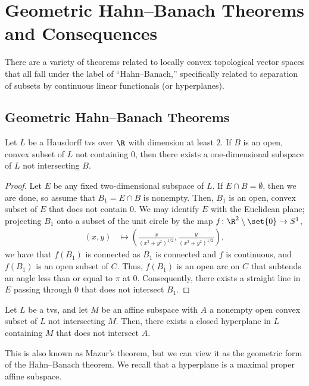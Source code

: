 \documentclass[10pt]{mypackage}
\begin{document}
\section{Geometric Hahn--Banach Theorems and Consequences}%
There are a variety of theorems related to locally convex topological vector spaces that all fall under the label of ``Hahn--Banach,'' specifically related to separation of subsets by continuous linear functionals (or hyperplanes).
\subsection{Geometric Hahn--Banach Theorems}%
\begin{lemma}
  Let $L$ be a Hausdorff tvs over $\R$ with dimension at least $2$. If $B$ is an open, convex subset of $L$ not containing $0$, then there exists a one-dimensional subspace of $L$ not intersecting $B$.
\end{lemma}
\begin{proof}
  Let $E$ be any fixed two-dimensional subspace of $L$. If $E\cap B = \emptyset$, then we are done, so assume that $B_1 = E\cap B$ is nonempty. Then, $B_1$ is an open, convex subset of $E$ that does not contain $0$. We may identify $E$ with the Euclidean plane; projecting $B_1$ onto a subset of the unit circle by the map $f\colon \R^2\setminus \set{0}\rightarrow S^{1}$,
  \begin{align*}
    \left( x,y \right) &\mapsto \left( \frac{x}{\left( x^2 + y^2 \right)^{1/2}},\frac{y}{\left( x^2 + y^2 \right)^{1/2}} \right),
  \end{align*}
  we have that $f\left( B_1 \right)$ is connected as $B_1$ is connected and $f$ is continuous, and $f\left( B_1 \right)$ is an open subset of $C$. Thus, $f\left( B_1 \right)$ is an open arc on $C$ that subtends an angle less than or equal to $\pi$ at $0$. Consequently, there exists a straight line in $E$ passing through $0$ that does not intersect $B_1$.
\end{proof}
\begin{theorem}
  Let $L$ be a tvs, and let $M$ be an affine subspace with $A$ a nonempty open convex subset of $L$ not intersecting $M$. Then, there exists a closed hyperplane in $L$ containing $M$ that does not intersect $A$.
\end{theorem}
This is also known as Mazur's theorem, but we can view it as the geometric form of the Hahn--Banach theorem. We recall that a hyperplane is a maximal proper affine subspace.
\end{document}
